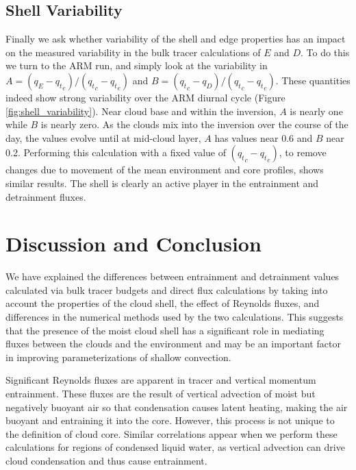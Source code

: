 \documentclass[12pt]{article}
\begin{document}

\subsection{Shell Variability}

Finally we ask whether variability of the shell and edge properties has an 
impact on the measured variability in the bulk tracer calculations of $E$ and 
$D$.  To do this we turn to the ARM run, and simply look at the variability in 
$A = (q_E - {q_t}_e)/({q_t}_c - {q_t}_e)$ and 
$B = ({q_t}_c - q_D)/({q_t}_c - {q_t}_e)$.  These quantities indeed show 
strong variability over the ARM diurnal cycle (Figure 
\ref{fig:shell_variability}).  Near cloud base and within the inversion, $A$ 
is nearly one while $B$ is nearly zero.  As the clouds mix into the inversion 
over the course of the day, the values evolve until at mid-cloud layer, $A$ 
has values near 0.6 and $B$ near 0.2.  Performing this calculation with a fixed 
value of $({q_t}_c - {q_t}_e)$, to remove changes due to movement of the mean 
environment and core profiles, shows similar results.  The shell is clearly an 
active player in the entrainment and detrainment fluxes.


\section{Discussion and Conclusion}

We have explained the differences between entrainment and detrainment values 
calculated via bulk tracer budgets and direct flux calculations by taking into 
account the properties of the cloud shell, the effect of Reynolds fluxes, and 
differences in the numerical methods used by the two calculations.  This 
suggests that the presence of the moist cloud shell has a significant role in 
mediating fluxes between the clouds and the environment and may be an important 
factor in improving parameterizations of shallow convection.

Significant Reynolds fluxes are apparent in tracer and vertical momentum 
entrainment.  These fluxes are the result of vertical advection of moist but 
negatively buoyant air so that condensation causes latent heating, making the 
air buoyant and entraining it into the core.  However, this process is not 
unique to the definition of cloud core.  Similar correlations appear when we 
perform these calculations for regions of condensed liquid water, as vertical 
advection can drive cloud condensation and thus cause entrainment.
\end{document}
